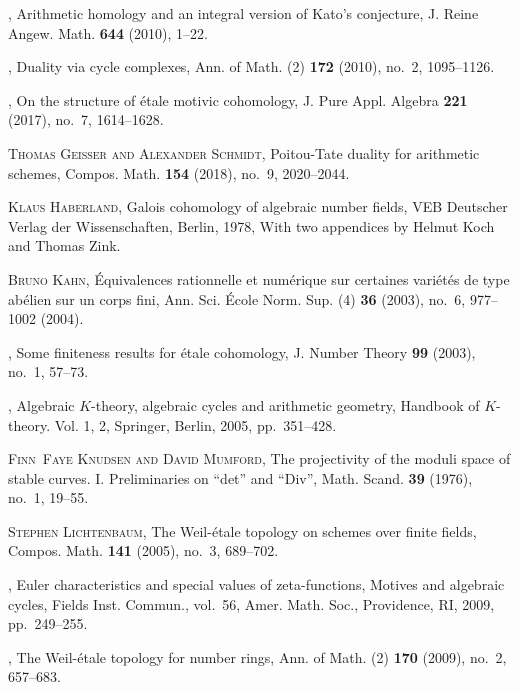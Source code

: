 \documentclass[leqno,12pt]{article}
\theoremstyle{plain}
\theoremstyle{definition}
\begin{document}
\begin{thebibliography}{99}
\bysame, Arithmetic homology and an integral version of {K}ato's
  conjecture, J. Reine Angew. Math. \textbf{644} (2010), 1--22.

\bysame, Duality via cycle complexes, Ann. of Math. (2) \textbf{172}
  (2010), no.~2, 1095--1126.

\bysame, On the structure of \'{e}tale motivic cohomology, J. Pure Appl.
  Algebra \textbf{221} (2017), no.~7, 1614--1628.

\textsc{Thomas Geisser and Alexander Schmidt}, Poitou-{T}ate duality for
  arithmetic schemes, Compos. Math. \textbf{154} (2018), no.~9, 2020--2044.

\textsc{Klaus Haberland}, Galois cohomology of algebraic number fields, VEB
  Deutscher Verlag der Wissenschaften, Berlin, 1978, With two appendices by
  Helmut Koch and Thomas Zink.

\textsc{Bruno Kahn}, \'{E}quivalences rationnelle et num\'{e}rique sur certaines
  vari\'{e}t\'{e}s de type ab\'{e}lien sur un corps fini, Ann. Sci. \'{E}cole
  Norm. Sup. (4) \textbf{36} (2003), no.~6, 977--1002 (2004).

\bysame, Some finiteness results for \'{e}tale cohomology, J. Number
  Theory \textbf{99} (2003), no.~1, 57--73.

\bysame, Algebraic {$K$}-theory, algebraic cycles and arithmetic
  geometry, Handbook of {$K$}-theory. {V}ol. 1, 2, Springer, Berlin, 2005,
  pp.~351--428.

\textsc{Finn~Faye Knudsen and David Mumford}, The projectivity of the moduli space
  of stable curves. {I}. {P}reliminaries on ``det'' and ``{D}iv'', Math.
  Scand. \textbf{39} (1976), no.~1, 19--55.

\textsc{Stephen Lichtenbaum}, The {W}eil-\'{e}tale topology on schemes over finite
  fields, Compos. Math. \textbf{141} (2005), no.~3, 689--702.

\bysame, Euler characteristics and special values of zeta-functions,
  Motives and algebraic cycles, Fields Inst. Commun., vol.~56, Amer. Math.
  Soc., Providence, RI, 2009, pp.~249--255.

\bysame, The {W}eil-\'{e}tale topology for number rings, Ann. of Math.
  (2) \textbf{170} (2009), no.~2, 657--683.


\end{thebibliography}
\end{document}
